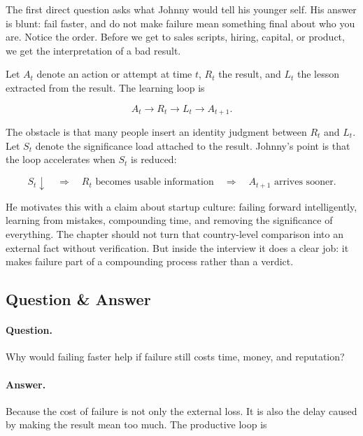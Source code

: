 The first direct question asks what Johnny would tell his younger self. His answer is blunt: fail faster, and do not make failure mean something final about who you are. Notice the order. Before we get to sales scripts, hiring, capital, or product, we get the interpretation of a bad result.

Let \(A_t\) denote an action or attempt at time \(t\), \(R_t\) the result, and \(L_t\) the lesson extracted from the result. The learning loop is

\begin{equation}
A_t \longrightarrow R_t \longrightarrow L_t \longrightarrow A_{t+1}.
\end{equation}

The obstacle is that many people insert an identity judgment between \(R_t\) and \(L_t\). Let \(S_t\) denote the significance load attached to the result. Johnny's point is that the loop accelerates when \(S_t\) is reduced:

\begin{equation}
S_t \downarrow
\quad \Longrightarrow \quad
R_t \text{ becomes usable information}
\quad \Longrightarrow \quad
A_{t+1} \text{ arrives sooner}.
\end{equation}

He motivates this with a claim about startup culture: failing forward intelligently, learning from mistakes, compounding time, and removing the significance of everything. The chapter should not turn that country-level comparison into an external fact without verification. But inside the interview it does a clear job: it makes failure part of a compounding process rather than a verdict.

\subsection{Question \& Answer}

\paragraph{Question.}
Why would failing faster help if failure still costs time, money, and reputation?

\paragraph{Answer.}
Because the cost of failure is not only the external loss. It is also the delay caused by making the result mean too much. The productive loop is

